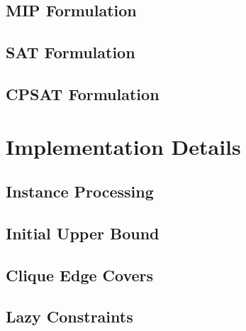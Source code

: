 \section{MIP Formulation}

\section{SAT Formulation}

\section{CPSAT Formulation}

\chapter{Implementation Details}

\section{Instance Processing}

\section{Initial Upper Bound}

\section{Clique Edge Covers}

\section{Lazy Constraints}